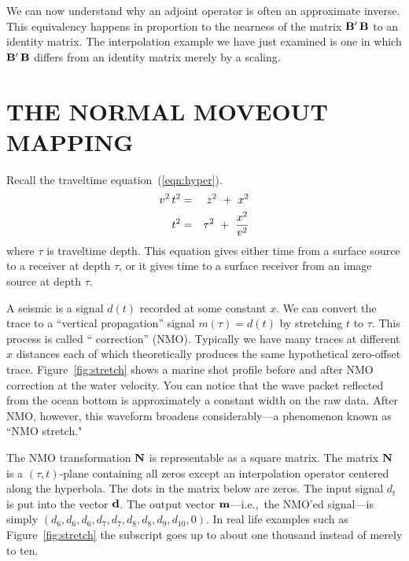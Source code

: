 \par
We can now understand why an adjoint operator is often an
approximate inverse.
This equivalency happens in proportion to the nearness of the matrix
$\bold B'\,\bold B$
to an identity matrix.
The interpolation example we have just examined is one in which
$\bold B'\,\bold B$
differs from an identity matrix merely by a scaling.

\section{THE NORMAL MOVEOUT MAPPING}
Recall the traveltime equation~(\ref{eqn:hyper}).
\begin{eqnarray}
v^2 \, t^2
&=&
z^2 \ +\  x^2
\\
t^2
&=&
\tau^2 \ +\ { x^2   \over  v^2 } 
\end{eqnarray}
where $\tau$ is traveltime depth.
This equation gives either time from a surface source
to a receiver at depth $\tau$,
or it gives time to a surface receiver
from an image source at depth $\tau$.

\par
A seismic  is a signal $d(t)$
recorded at some constant $x$.
We can convert the trace
to a ``vertical propagation'' signal
$m(\tau)=d(t)$
by stretching $t$ to $\tau$.
This process is called
`` correction'' (NMO).
Typically we have many traces at different $x$ distances
each of which theoretically produces the same
hypothetical zero-offset trace.
Figure~\ref{fig:stretch} shows a marine shot profile
before and after NMO correction at the water velocity.
You can notice that the wave packet reflected from the ocean bottom
is approximately a constant width on the raw data.
After NMO, however,
this waveform broadens considerably---a phenomenon known
as ``NMO stretch."


\par
The  NMO  transformation ${\bf N}$ is representable as a square matrix.
The matrix  ${\bf N}$  is a $(\tau,t)$-plane containing all zeros
except an interpolation operator centered along the hyperbola.
The dots in the matrix below are zeros.
The input signal $d_t$ is put into the vector $\bold d$.
The output vector $\bold m$---i.e.,~the NMO'ed signal---is simply
$(d_6,d_6,d_6, d_7,d_7, d_8,d_8, d_9, d_{10}, 0)$.
In real life examples such as Figure~\ref{fig:stretch}
the subscript goes up to about one thousand instead of
merely to ten.

